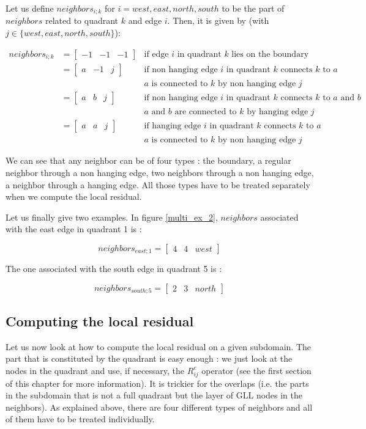 Let us define $neighbors_{i;k}$ for $i=west,east,north,south$ to be the part of $neighbors$ related to quadrant $k$ and edge $i$. Then, it is given by (with $j \in \{west,east,north,south\}$): 

\begin{align*}
neighbors_{i;k} &= \begin{bmatrix}
-1 & -1 & -1
\end{bmatrix} &\text{if edge $i$ in quadrant $k$ lies on the boundary}\\
&= \begin{bmatrix}
a & -1 & j
\end{bmatrix} &\text{if non hanging edge $i$ in quadrant $k$ connects $k$ to $a$}\\
& &\text{$a$ is connected to $k$ by non hanging edge $j$}\\
&= \begin{bmatrix}
a & b & j
\end{bmatrix} &\text{if non hanging edge $i$ in quadrant $k$ connects $k$ to $a$ and $b$}\\
& &\text{$a$ and $b$ are connected to $k$ by hanging edge $j$}\\
&= \begin{bmatrix}
a & a & j
\end{bmatrix} &\text{if hanging edge $i$ in quadrant $k$ connects $k$ to $a$}\\
& &\text{$a$ is connected to $k$ by non hanging edge $j$}
\end{align*}

We can see that any neighbor can be of four types : the boundary, a regular neighbor through a non hanging edge, two neighbors through a non hanging edge, a neighbor through a hanging edge. All those types have to be treated separately when we compute the local residual. 

Let us finally give two examples. In figure \ref{multi_ex_2}, $neighbors$ associated with the east edge in quadrant 1 is : 

$$neighbors_{east;1} = \begin{bmatrix}
4 & 4 & west
\end{bmatrix}$$

The one associated with the south edge in quadrant 5 is : 

$$neighbors_{south;5} = \begin{bmatrix}
2 & 3 & north
\end{bmatrix}$$

\subsection{Computing the local residual}
Let us now look at how to compute the local residual on a given subdomain. The part that is constituted by the quadrant is easy enough : we just look at the nodes in the quadrant and use, if necessary, the $R_{ij}^e$ operator (see the first section of this chapter for more information). It is trickier for the overlaps (i.e. the parts in the subdomain that is not a full quadrant but the layer of GLL nodes in the neighbors). As explained above, there are four different types of neighbors and all of them have to be treated individually. 

